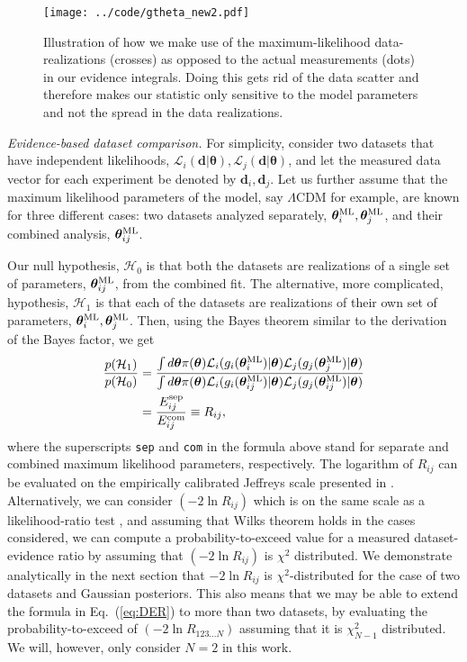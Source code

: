 \documentclass[amsmath, prl, reprint, aps]{revtex4-1}
\newcommand{\dv}{\textbf{d}}
\newcommand{\tv}{\bm{\theta}}
\newcommand{\tML}{\tv^{\rm ML}}
\begin{document}
    \begin{figure}
        \texttt{[image: ../code/gtheta\_new2.pdf]}
        \caption{Illustration of how we make use of the maximum-likelihood data-realizations (crosses) as opposed to the actual measurements (dots) in our evidence integrals. Doing this gets rid of the data scatter and therefore makes our statistic only sensitive to the model parameters and not the spread in the data realizations.}
        \label{fig:gtheta}
    \end{figure}
    
    \medskip
    \textit{Evidence-based dataset comparison.}
    For simplicity, consider two datasets that have independent likelihoods, $\mathcal{L}_i(\dv|\tv), \mathcal{L}_j(\dv|\tv)$, and let the measured data vector for each experiment be denoted by $\dv_i, \dv_j$. Let us further assume that the maximum likelihood parameters of the model, say $\Lambda$CDM for example, are known for three different cases: two datasets analyzed separately, $\tML_i, \tML_j$, and their combined analysis, $\tML_{ij}$.
    
    Our null hypothesis, $\mathcal{H}_0$ is that both the datasets are realizations of a single set of parameters, $\tML_{ij}$, from the combined fit. The alternative, more complicated, hypothesis, $\mathcal{H}_1$ is that each of the datasets are realizations of their own set of parameters, $\tML_i, \tML_j$. Then, using the Bayes theorem similar to the derivation of the Bayes factor, we get
    \begin{equation}
    \begin{aligned}
    \frac{p(\mathcal{H}_1)}{p(\mathcal{H}_0)} &= \frac{\int d\tv \pi(\tv) \mathcal{L}_i(g_i(\tML_i)|\tv) \mathcal{L}_j(g_j(\tML_j)|\tv)}{\int d\tv \pi(\tv) \mathcal{L}_i(g_i(\tML_{ij})|\tv) \mathcal{L}_j(g_j(\tML_{ij})|\tv)} \label{eq:DER} \\
    &= \frac{E_{ij}^{\rm sep}}{{E_{ij}^{\rm com}}} \equiv R_{ij},
    \end{aligned}
    \end{equation}
    where the superscripts \texttt{sep} and \texttt{com} in the formula above stand for separate and combined maximum likelihood parameters, respectively. The logarithm of $R_{ij}$ can be evaluated on the empirically calibrated Jeffreys scale presented in \cite{Trotta:2008qt}. Alternatively, we can consider $(-2\ln R_{ij})$ which is on the same scale as a likelihood-ratio test \cite{kassr95}, and assuming that Wilks theorem \cite{Wilks} holds in the cases considered, we can compute a probability-to-exceed value for a measured dataset-evidence ratio by assuming that $(-2\ln R_{ij})$ is $\chi^2$ distributed. We demonstrate analytically in the next section that $-2\ln R_{ij}$ is $\chi^2$-distributed for the case of two datasets and Gaussian posteriors. This also means that we may be able to extend the formula in Eq.~(\ref{eq:DER}) to more than two datasets, by evaluating the probability-to-exceed of $(-2\ln R_{123...N})$ assuming that it is $\chi^2_{N-1}$ distributed. We will, however, only consider $N=2$ in this work.
    
\end{document}
